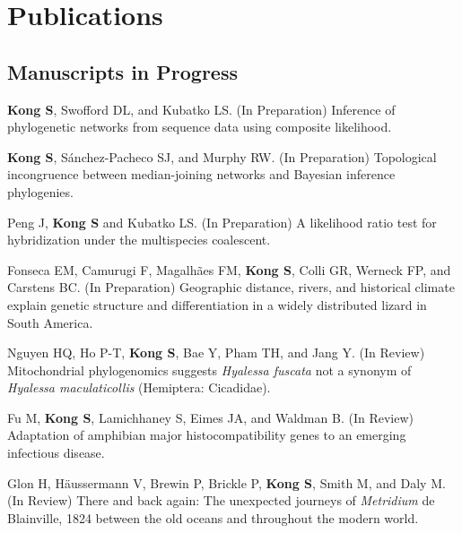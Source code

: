 \documentclass[11pt]{article}
\begin{document}
\hspace{0pt}


\section*{Publications}
\subsection*{Manuscripts in Progress}
\begin{etaremune}




	\item \textbf{Kong S}, Swofford DL, and Kubatko LS. (In Preparation) Inference of phylogenetic networks from sequence data using composite likelihood. %

	\item \textbf{Kong S}, Sánchez-Pacheco SJ, and Murphy RW. (In Preparation) Topological incongruence between median-joining networks and Bayesian inference phylogenies. %
	
	\item Peng J, \textbf{Kong S} and Kubatko LS. (In Preparation) A likelihood ratio test for hybridization under the multispecies coalescent. %
		
	\item Fonseca EM, Camurugi F, Magalhães FM, \textbf{Kong S}, Colli GR, Werneck FP, and Carstens BC. (In Preparation) Geographic distance, rivers, and historical climate explain genetic structure and differentiation in a widely distributed lizard in South America. %

	\item Nguyen HQ, Ho P-T, \textbf{Kong S}, Bae Y, Pham TH, and Jang Y. (In Review) Mitochondrial phylogenomics suggests \textit{Hyalessa fuscata} not a synonym of \textit{Hyalessa maculaticollis} (Hemiptera: Cicadidae).

	\item Fu M, \textbf{Kong S}, Lamichhaney S, Eimes JA, and Waldman B. (In Review) Adaptation of amphibian major histocompatibility genes to an emerging infectious disease. %
	
	\item Glon H, Häussermann V, Brewin P, Brickle P, \textbf{Kong S}, Smith M, and Daly M. (In Review) There and back again: The unexpected journeys of \textit{Metridium} de Blainville, 1824 between the old oceans and throughout the modern world. %
		

	
\end{etaremune}
\end{document}
